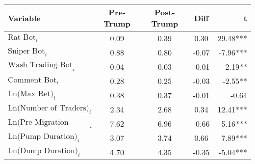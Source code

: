 \begin{tabular}{lcccr}
\toprule
Variable & Pre-Trump & Post-Trump & Diff & t \\
\midrule
$\text{Rat Bot}_{i}$ & 0.09 & 0.39 & 0.30 & 29.48*** \\
$\text{Sniper Bot}_{i}$ & 0.88 & 0.80 & -0.07 & -7.96*** \\
$\text{Wash Trading Bot}_{i}$ & 0.04 & 0.03 & -0.01 & -2.19** \\
$\text{Comment Bot}_{i}$ & 0.28 & 0.25 & -0.03 & -2.55** \\
$\text{Ln(Max Ret)}_{i}$ & 0.38 & 0.37 & -0.01 & -0.64 \\
$\text{Ln(Number of Traders)}_{i}$ & 2.34 & 2.68 & 0.34 & 12.41*** \\
$\text{Ln(Pre-Migration Duration)}_{i}$ & 7.62 & 6.96 & -0.66 & -5.16*** \\
$\text{Ln(Pump Duration)}_{i}$ & 3.07 & 3.74 & 0.66 & 7.89*** \\
$\text{Ln(Dump Duration)}_{i}$ & 4.70 & 4.35 & -0.35 & -5.04*** \\
\bottomrule
\end{tabular}